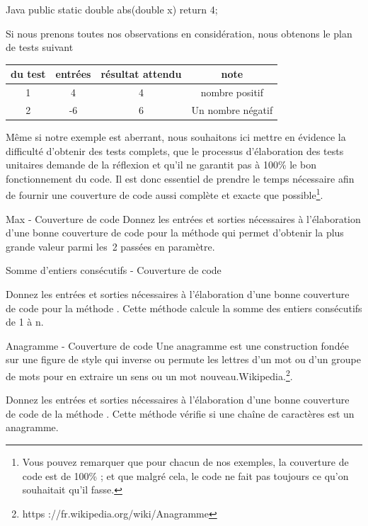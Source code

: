 \documentclass[a4paper,11pt]{article}
\begin{document}
	\begin{Code}{Java}
		public static double abs(double x) {
			return 4;
		}
	\end{Code}

	Si nous prenons toutes nos observations en considération, nous obtenons le plan de tests suivant

	\begin{center}
		\begin{tabular}{|c|c|c|c|}
			\hline
			\no du test & entrées & résultat attendu & note \\
			\hline
			1 & 4 & 4 & nombre positif \\
			\hline
			2 & -6 & 6 & Un nombre négatif \\
			\hline
		\end{tabular}
	\end{center}

	Même si notre exemple est aberrant, nous souhaitons ici mettre en évidence la difficulté d'obtenir des tests complets, que le processus d’élaboration des tests unitaires demande de la réflexion et qu’il ne garantit pas à 100\% le bon fonctionnement du code. Il est donc essentiel de prendre le temps nécessaire afin de fournir une couverture de code aussi complète et exacte que possible\footnote{Vous pouvez remarquer que pour chacun de nos exemples, la couverture de code est de 100\% ; et que malgré cela, le code ne fait pas toujours ce qu'on souhaitait qu'il fasse.}.

	\begin{Exercice}{Max - Couverture de code}
		Donnez les entrées et sorties nécessaires à l’élaboration d’une bonne couverture de code pour la méthode  qui permet d’obtenir la plus grande valeur parmi les~2 passées en paramètre.
	\end{Exercice}

	\begin{Exercice}{Somme d'entiers consécutifs - Couverture de code}
		
		Donnez les entrées et sorties nécessaires à l’élaboration d’une bonne couverture de code pour la méthode . Cette méthode calcule la somme des entiers consécutifs de 1 à n.
	\end{Exercice}

	\begin{Exercice}{Anagramme - Couverture de code}
		\og Une anagramme est une construction fondée sur une figure de style qui inverse ou permute les lettres d’un mot ou d’un groupe de mots pour en extraire un sens ou un mot nouveau.\fg Wikipedia.\footnote{https ://fr.wikipedia.org/wiki/Anagramme}. 

		Donnez les entrées et sorties nécessaires à l’élaboration d’une bonne couverture de code de la méthode . Cette méthode vérifie si une chaîne de caractères est un anagramme.
	\end{Exercice}
\end{document}
